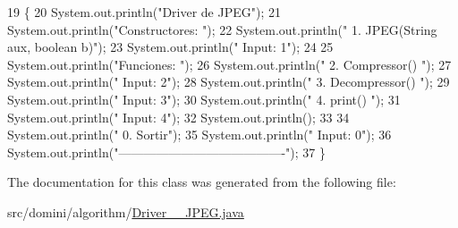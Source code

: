 \begin{DoxyCode}
19                                      \{
20         System.out.println(\textcolor{stringliteral}{"Driver de JPEG"});
21         System.out.println(\textcolor{stringliteral}{"Constructores: "});
22         System.out.println(\textcolor{stringliteral}{"     1. JPEG(String aux, boolean b)"});
23         System.out.println(\textcolor{stringliteral}{"     Input: 1"});
24 
25         System.out.println(\textcolor{stringliteral}{"Funciones: "});
26         System.out.println(\textcolor{stringliteral}{"     2. Compressor() "});
27         System.out.println(\textcolor{stringliteral}{"     Input: 2"});
28         System.out.println(\textcolor{stringliteral}{"     3. Decompressor() "});
29         System.out.println(\textcolor{stringliteral}{"     Input: 3"});
30         System.out.println(\textcolor{stringliteral}{"     4. print() "});
31         System.out.println(\textcolor{stringliteral}{"     Input: 4"});
32         System.out.println();
33 
34         System.out.println(\textcolor{stringliteral}{"     0. Sortir"});
35         System.out.println(\textcolor{stringliteral}{"     Input: 0"});
36         System.out.println(\textcolor{stringliteral}{"----------------------------------------"});
37     \}
\end{DoxyCode}


The documentation for this class was generated from the following file\+:\begin{DoxyCompactItemize}
\item 
src/domini/algorithm/\hyperlink{Driver____JPEG_8java}{Driver\+\_\+\+\_\+\+J\+P\+E\+G.\+java}\end{DoxyCompactItemize}
